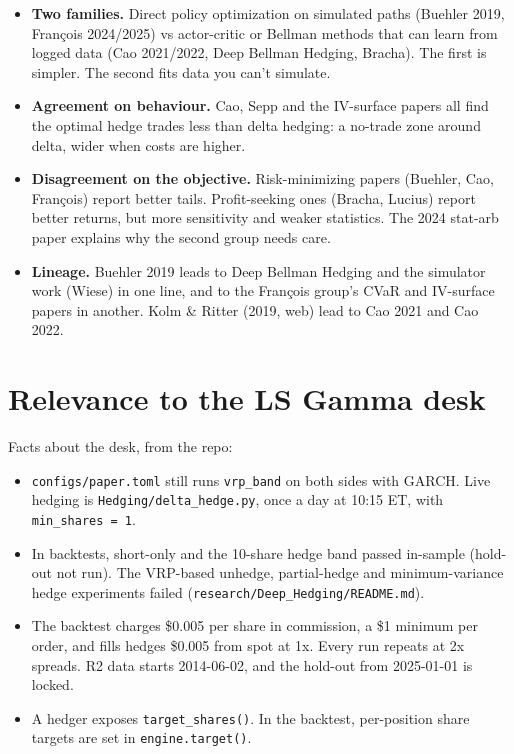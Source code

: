 \documentclass{article}
\begin{document}
\begin{itemize}

\item \textbf{Two families.} Direct policy optimization on simulated paths (Buehler 2019, François 2024/\allowbreak{}2025) vs actor-critic or Bellman methods that can learn from logged data (Cao 2021/\allowbreak{}2022, Deep Bellman Hedging, Bracha). The first is simpler. The second fits data you can't simulate.

\item \textbf{Agreement on behaviour.} Cao, Sepp and the IV-surface papers all find the optimal hedge trades less than delta hedging: a no-trade zone around delta, wider when costs are higher.

\item \textbf{Disagreement on the objective.} Risk-minimizing papers (Buehler, Cao, François) report better tails. Profit-seeking ones (Bracha, Lucius) report better returns, but more sensitivity and weaker statistics. The 2024 stat-arb paper explains why the second group needs care.

\item \textbf{Lineage.} Buehler 2019 leads to Deep Bellman Hedging and the simulator work (Wiese) in one line, and to the François group's CVaR and IV-surface papers in another. Kolm \& Ritter (2019, web) lead to Cao 2021 and Cao 2022.

\end{itemize}

\section{Relevance to the LS Gamma desk}

Facts about the desk, from the repo:

\begin{itemize}

\item \texttt{configs/\allowbreak{}paper.\allowbreak{}toml} still runs \texttt{vrp\_\allowbreak{}band} on both sides with GARCH. Live hedging is \texttt{Hedging/\allowbreak{}delta\_\allowbreak{}hedge.\allowbreak{}py}, once a day at 10:15 ET, with \texttt{min\_\allowbreak{}shares = 1}.

\item In backtests, short-only and the 10-share hedge band passed in-sample (hold-out not run). The VRP-based unhedge, partial-hedge and minimum-variance hedge experiments failed (\texttt{research/\allowbreak{}Deep\_\allowbreak{}Hedging/\allowbreak{}README.\allowbreak{}md}).

\item The backtest charges \$0.005 per share in commission, a \$1 minimum per order, and fills hedges \$0.005 from spot at 1x. Every run repeats at 2x spreads. R2 data starts 2014-06-02, and the hold-out from 2025-01-01 is locked.

\item A hedger exposes \texttt{target\_\allowbreak{}shares()}. In the backtest, per-position share targets are set in \texttt{engine.\allowbreak{}target()}.

\end{itemize}
\end{document}
